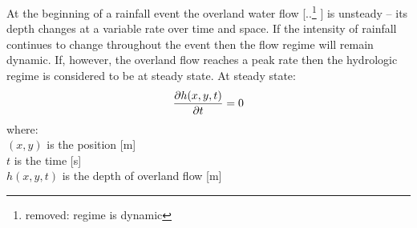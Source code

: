 \documentclass[gmd, manuscript]{copernicus}
\providecommand{\DIFadd}[1]{{\protect\color{blue} \sf #1}} %
\providecommand{\DIFdel}[1]{{\protect\color{red} [..\footnote{removed: #1} ]}} %
\providecommand{\DIFaddbegin}{} %
\providecommand{\DIFaddend}{} %
\providecommand{\DIFdelbegin}{} %
\providecommand{\DIFdelend}{} %
\begin{document}
At the beginning of a rainfall event 
the overland water flow \DIFdelbegin \DIFdel{regime is dynamic }\DIFdelend \DIFaddbegin \DIFadd{is unsteady }\DIFaddend -- 
its depth changes at a variable rate over time and space. 
If the intensity of rainfall continues to change throughout the event
then the flow regime will remain dynamic. 
If, however, the overland flow reaches a peak rate
then the hydrologic regime is considered to be at steady state.
At steady state:
\begin{equation}
\label{eq:steady_state}
{\partial h(x,y,t) \over \partial t} = 0
\end{equation}
%
{\small
\noindent
where: \\
\noindent
\hspace*{0.5em} $(x,y)$ is the position [\unit{m}]\\
\hspace*{0.5em} $t$ is the time [\unit{s}]\\
\hspace*{0.5em} $h(x,y,t)$ is the depth of overland flow [\unit{m}]\\
}
\end{document}
